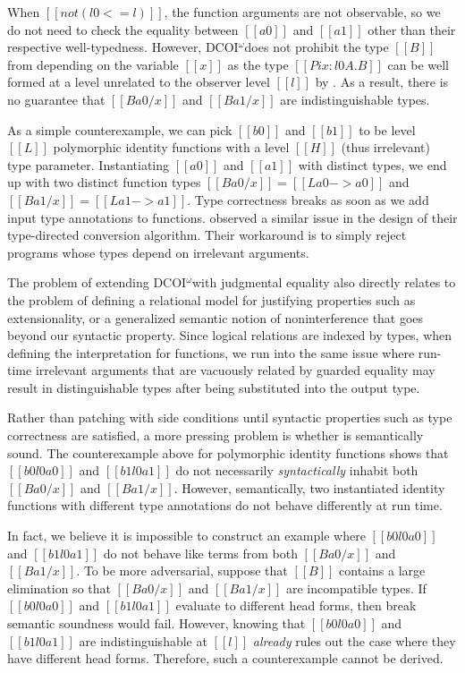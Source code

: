 \documentclass[acmsmall, screen=true, nonacm=true,
  review=\ifpublic false\else true\fi,
  anonymous=\ifanonymous true\else false\fi
]{acmart}
\makeatletter
\newcommand{\name}{\texorpdfstring{DCOI$^{\omega}$\@\xspace}{DCOI-omega}}
\makeatother
\begin{document}
When $[[not (l0 <= l)]]$, the function
arguments are not observable, so we do not need to check the
equality between $[[a0]]$ and $[[a1]]$ other than their respective
well-typedness. However, \name does not prohibit the type $[[B]]$ from
depending on the variable $[[x]]$ as the type $[[Pi x : l0 A . B]]$
can be well formed at a level unrelated to the observer level $[[l]]$
by .
As a result, there is no guarantee that $[[B {a0 / x}]]$ and $[[B {a1
  / x}]]$ are indistinguishable types. 

As a simple counterexample, we can pick $[[b0]]$ and $[[b1]]$ to be
level $[[L]]$ polymorphic identity functions with a level $[[H]]$
(thus irrelevant)
type parameter. Instantiating $[[a0]]$ and $[[a1]]$ with distinct
types, we end up with two distinct function types $[[B {a0 / x}]] = [[L
a0 -> a0]]$ and $[[B {a1 / x}]] = [[L a1 -> a1]]$. Type correctness
breaks as soon as we add input type annotations to
functions. \citet{abel:irrelevance} observed a similar issue in the
design of their type-directed conversion algorithm. Their workaround is
to simply reject programs whose types depend on irrelevant arguments.

The problem of extending \name with judgmental equality also
directly relates to the problem of defining a relational model for justifying properties
such as extensionality, or a generalized semantic notion of noninterference
that goes beyond our syntactic  property.
Since logical relations are indexed by types,
when defining the interpretation for functions, we run into the same
issue where run-time irrelevant arguments that are vacuously related by guarded
equality may result in distinguishable types after being substituted
into the output type.

Rather than patching  with side conditions until
syntactic properties such as type correctness are satisfied, a more
pressing problem is whether  is semantically sound.
The counterexample above for polymorphic identity functions
shows that $[[b0 l0 a0]]$ and $[[b1 l0 a1]]$ do not necessarily
\emph{syntactically} inhabit both $[[B {a0 / x}]]$ and $[[B {a1 / x}]]$. However,
semantically, two instantiated identity functions with different type
annotations do not behave differently at run time.

In fact, we believe it is impossible to construct an
example where $[[b0 l0 a0]]$ and $[[b1 l0 a1]]$ do not behave
like terms from both $[[B {a0 / x}]]$ and $[[B {a1 / x}]]$.
To be more adversarial, suppose that $[[B]]$ contains a large elimination so that $[[B
{a0 /x}]]$ and $[[B {a1 / x}]]$ are incompatible types. If $[[b0 l0
a0]]$ and $[[b1 l0 a1]]$ evaluate to different head forms, then 
break semantic soundness would fail. However, knowing that $[[b0 l0 a0]]$ and
$[[b1 l0 a1]]$ are indistinguishable at $[[l]]$ \emph{already} rules out the
case where they have different head forms. Therefore, such a counterexample
cannot be derived.
\end{document}
